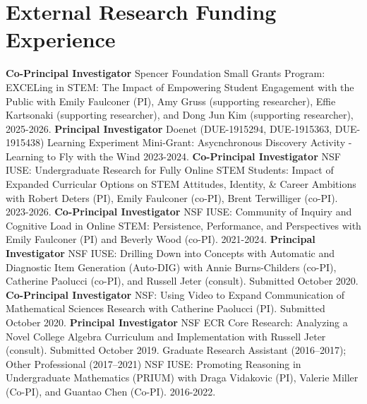 \documentclass[10pt,a4paper,sans]{moderncv}
\begin{document}
\section{External Research Funding Experience}
	{\textbf{Co-Principal Investigator}}
	{Spencer Foundation Small Grants Program: EXCELing in STEM: The Impact of Empowering Student Engagement with the Public}
	{with Emily Faulconer (PI), Amy Gruss (supporting researcher), Effie Kartsonaki (supporting researcher), and Dong Jun Kim (supporting researcher), 2025-2026.}
	{}{}
	{\textbf{Principal Investigator}}
	{Doenet (DUE-1915294, DUE-1915363, DUE-1915438) Learning Experiment Mini-Grant: Asycnchronous Discovery Activity - Learning to Fly with the Wind}
	{2023-2024.}
	{}{}
	{\textbf{Co-Principal Investigator}}
	{NSF IUSE: Undergraduate Research for Fully Online STEM Students: Impact of Expanded Curricular Options on STEM Attitudes, Identity, \& Career Ambitions}
	{with Robert Deters (PI), Emily Faulconer (co-PI), Brent Terwilliger (co-PI). 2023-2026.}
	{}{}
	{\textbf{Co-Principal Investigator}}
	{NSF IUSE: Community of Inquiry and Cognitive Load in Online STEM: Persistence, Performance, and Perspectives}
	{with Emily Faulconer (PI) and Beverly Wood (co-PI). 2021-2024.}
	{}{}
	{\textbf{Principal Investigator}}
	{NSF IUSE: Drilling Down into Concepts with Automatic and Diagnostic Item Generation (Auto-DIG)}
	{with Annie Burns-Childers (co-PI), Catherine Paolucci (co-PI), and Russell Jeter (consult). Submitted October 2020.}
	{}{}
	{\textbf{Co-Principal Investigator}}
	{NSF: Using Video to Expand Communication of Mathematical Sciences Research}
	{with Catherine Paolucci (PI). Submitted October 2020.}
	{}{}
	{\textbf{Principal Investigator}}
	{NSF ECR Core Research: Analyzing a Novel College Algebra Curriculum and Implementation}
	{with Russell Jeter (consult). Submitted October 2019.}
	{}{}
	{Graduate Research Assistant (2016--2017); Other Professional (2017--2021)}
	{NSF IUSE: Promoting Reasoning in Undergraduate Mathematics (PRIUM)}
	{with Draga Vidakovic (PI), Valerie Miller (Co-PI), and Guantao Chen (Co-PI). 2016-2022.}
	{}{}
\end{document}
